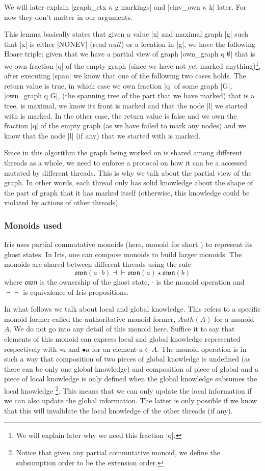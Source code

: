 \documentclass[nocopyrightspace]{sigplanconf}
\newcommand{\Auth}{\mathit{Auth}}
\newcommand{\own}{\mathfrak{own}}
\begin{document}
We will later explain \Coqe|graph_ctx $\kappa$ g markings| and
\Coqe|cinv_own $\kappa$ k| later. For now they don't matter in our
arguments.

This lemma basically states that given a value \Coqe|x| and maximal graph
\Coqe|g| such that \Coqe|x| is either \Coqe|NONEV| (read $\mathit{null}$) or a location in \Coqe|g|, we have the following Hoare triple:
given that we have a partial view of graph \Coqe|own_graph q $\emptyset$| that is we own fraction \Coqe|q| of the empty graph
(since we have not yet marked anything)\footnote {We will explain later why we need this fraction \Coqe|q|.}, after executing \Coqe|span|
we know that one of the following two cases holds.
The return value is true, in which case we own fraction \Coqe|q| of some
graph \Coqe|G|, \Coqe|own_graph q G|, (the spanning tree of the part that we have marked) that
is a tree, is maximal, we know its front is marked and that the node \Coqe|l| we started with is marked.
In the other case, the return value is false and we own the fraction \Coqe|q| of the empty graph (as we have failed to mark any nodes)
and we know that the node \Coqe|l| (if any) that we started with is marked.

Since in this algorithm the graph being worked on is shared among different threads as a whole, we need to enforce a protocol on how it
can be a accessed mutated by different threads.
This is why we talk about the partial view of the graph.
In other words, each thread only has solid knowledge about the shape of
the part of graph that it has marked itself (otherwise, this knowledge could be violated by actions of other threads).

\subsubsection{Monoids used}
Iris uses partial commutative monoids (here, monoid for short ) to represent its ghost states.
In Iris, one can compose monoids to build larger monoids.
The monoids are shared between different threads using the rule
\[
\own(a \cdot b) \dashv\vdash \own(a) \star \own(b)
\]
where $\own$ is the ownership of the ghost state, $\cdot$ is the monoid
operation and $\dashv\vdash$ is equivalence of Iris propositions.

In what follows we talk about local and global knowledge.
This refers to a specific monoid former called the authoritative
monoid former, $\Auth(A)$ for a monoid $A$.
We do not go into any detail of this monoid here.
Suffice it to say that elements of this monoid can express local and
global knowledge represented respectively with $\circ a$ and $\bullet a$
for an element $a \in A$.
The monoid operation is in such a way that composition of two
pieces of global knowledge is undefined (as there can be only one global knowledge) and composition of piece of global and a piece of local knowledge
is only defined when the global knowledge subsumes the local knowledge \footnote{Notice that given any partial commutative monoid, we define the subsumption order to be the extension order.}.
This means that we can only update the local information if we can also
update the global information.
The latter is only possible if we know that this will invalidate the local
knowledge of the other threads (if any).
\end{document}
